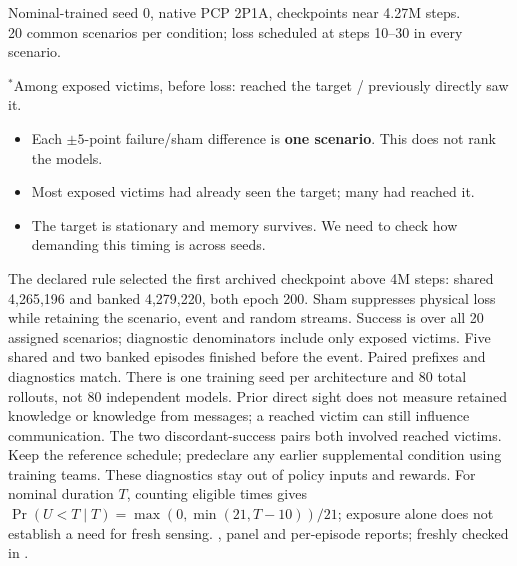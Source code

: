 {\small Nominal-trained seed 0, native PCP 2P1A, checkpoints near 4.27M steps.\\
20 common scenarios per condition; loss scheduled at steps 10--30 in every scenario.
\medskip
\begin{center}

\end{center}
\small $^*$Among exposed victims, before loss: reached the target / previously directly saw it.
\medskip
\begin{itemize}
\item Each $\pm5$-point failure/sham difference is \textbf{one scenario}. This does not rank the models.
\item Most exposed victims had already seen the target; many had reached it.
\item The target is stationary and memory survives. We need to check how demanding this timing is across seeds.
\end{itemize}}
{The declared rule selected the first archived checkpoint above 4M steps: shared 4,265,196 and banked 4,279,220, both epoch 200. Sham suppresses physical loss while retaining the scenario, event and random streams. Success is over all 20 assigned scenarios; diagnostic denominators include only exposed victims. Five shared and two banked episodes finished before the event. Paired prefixes and diagnostics match. There is one training seed per architecture and 80 total rollouts, not 80 independent models. Prior direct sight does not measure retained knowledge or knowledge from messages; a reached victim can still influence communication. The two discordant-success pairs both involved reached victims. Keep the reference schedule; predeclare any earlier supplemental condition using training teams. These diagnostics stay out of policy inputs and rewards. For nominal duration $T$, counting eligible times gives $\Pr(U<T\mid T)=\max(0,\min(21,T-10))/21$; exposure alone does not establish a need for fresh sensing.}
{, panel and per-episode reports; freshly checked in .}

